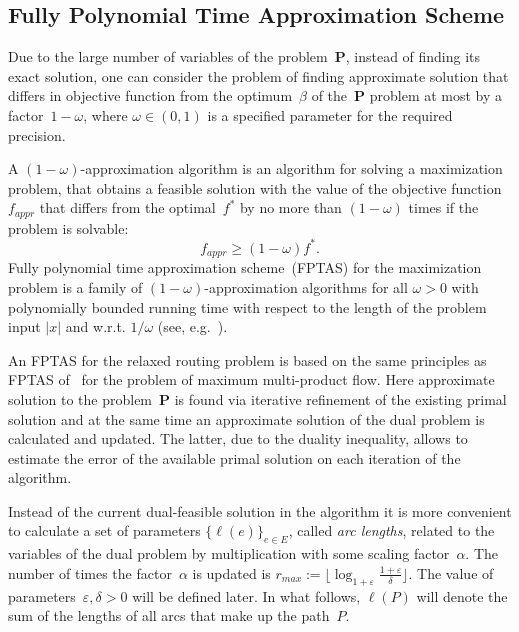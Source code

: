 \documentclass{ifacconf}
\begin{document}
\subsection{Fully Polynomial Time Approximation Scheme}
\label{FPTAS}

Due to the large number of variables  of the problem~{\bf P}, instead of finding
its exact solution, one can consider the problem of finding
approximate solution that differs in objective function from
the optimum~$\beta$ of the~{\bf P} problem at most by a factor~$1-\omega$,
where $\omega \in (0,1)$ is a specified parameter for the required precision.

A $(1-\omega)$-approximation algorithm is an algorithm for solving a maximization problem,
 that obtains a feasible solution with the value of the objective
function~$f_{appr}$ that differs from the optimal~$f^*$ by no more than
$(1-\omega)$ times if the problem is solvable:
$$
f_{appr} \ge (1-\omega) f^*.
$$
Fully polynomial time approximation scheme~(FPTAS) for the maximization problem
 is a family of $(1-\omega)$-approximation algorithms for all $\omega>0$ with polynomially bounded running time
with respect to the length of the problem input $|x|$ and w.r.t. $1/\omega$ (see,
e.g.~\cite{GJ}).

An FPTAS for the relaxed routing problem is based on
the same principles as FPTAS of~\cite{Fleis2000} for the problem of
maximum multi-product flow.
Here approximate solution to the problem~{\bf P} is found via
iterative refinement of the existing primal solution and at the same time
an approximate solution of the dual problem is calculated and updated.
The latter, due to the duality inequality, allows to estimate the error of the available primal
solution on each
iteration of the algorithm.

Instead of the current dual-feasible solution in the algorithm
it is more convenient to calculate a set of parameters $\{\ell(e)\}_{e\in E}$,
called {\em arc lengths}, related to
the variables of the dual problem by multiplication
with some scaling factor~$\alpha$. The number of times the factor~$\alpha$ is updated is
$r_{max}:=\lfloor \log_{1+\varepsilon}
 \frac{1+\varepsilon}{\delta}\rfloor$. The value of parameters~$\varepsilon, \delta>0$ will be
defined later. In what follows, $\ell(P)$
will denote the sum of the lengths of all arcs that make up the path~$P.$
\end{document}
